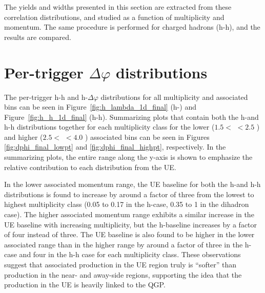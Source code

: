 The yields and widths presented in this section are extracted from these correlation distributions, and studied as a function of multiplicity and \lmb momentum. The same procedure is performed for charged hadrons (h-h), and the results are compared.

\section{Per-trigger $\Delta\varphi$ distributions}

The per-trigger h-h and h-\lmb $\Delta\varphi$ distributions for all multiplicity and associated \pt bins can be seen in Figure~\ref{fig:h_lambda_1d_final} (h-\lmb) and Figure~\ref{fig:h_h_1d_final} (h-h). Summarizing plots that contain both the h-\lmb and h-h distributions together for each multiplicity class for the lower ($1.5 <$ \pt $< 2.5$ \GeVc) and higher ($2.5 < $ \pt $< 4.0$ \GeVc) associated \pt bins can be seen in Figures \ref{fig:dphi_final_lowpt} and \ref{fig:dphi_final_highpt}, respectively. In the summarizing plots, the entire range along the y-axis is shown to emphasize the relative contribution to each distribution from the UE. 

In the lower associated momentum range, the UE baseline for both the h-\lmb and h-h distributions is found to increase by around a factor of three from the lowest to highest multiplicity class (0.05 to 0.17 in the h-\lmb case, 0.35 to 1 in the dihadron case). The higher associated momentum range exhibits a similar increase in the UE baseline with increasing multiplicity, but the h-\lmb baseline increases by a factor of four instead of three. The UE baseline is also found to be higher in the lower associated \pt range than in the higher range by around a factor of three in the h-\lmb case and four in the h-h case for each multiplicity class. These observations suggest that associated production in the UE region truly is ``softer'' than production in the near- and away-side regions, supporting the idea that the production in the UE is heavily linked to the QGP.

